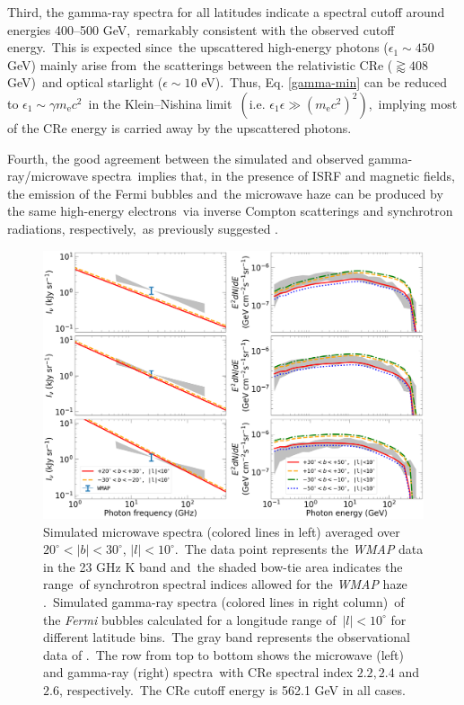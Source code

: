 \documentclass[fleqn,usenatbib,useAMS]{mnras}
\begin{document}
Third, the gamma-ray spectra for all latitudes indicate a spectral cutoff around energies 400--500 GeV,\
remarkably consistent with the observed cutoff energy.\
This is expected since\
the upscattered high-energy photons ($\epsilon_{1}\sim450$ GeV) mainly arise from\
the scatterings between the relativistic CRe ($\gtrapprox 408$ GeV)\
and optical starlight ($\epsilon \sim 10$ eV).\
Thus, Eq. \ref{gamma-min} can be reduced to $\epsilon_{1}\sim\gamma m_{\text{e}}c^2$\
in the Klein--Nishina limit\
$\left(\text{i.e. }\epsilon_{1}\epsilon \gg \left(m_{\text{e}}c^2\right)^2\right)$,\
implying most of the CRe energy is carried away by the upscattered photons.

Fourth, the good agreement between the simulated and observed gamma-ray/microwave spectra\
implies that, in the presence of ISRF and magnetic fields, the emission of the Fermi bubbles and\
the microwave haze can be produced by the same high-energy electrons\
via inverse Compton scatterings and synchrotron radiations, respectively,\
as previously suggested \citep{Su2010,Dobler2012}.

\begin{figure}
  \includegraphics[width=\linewidth]{figures/fig__spectrum.png}
  \caption{
      Simulated microwave spectra (colored lines in left) averaged over $20^{\circ}<|b|<30^{\circ}$, $|l|<10^{\circ}$.\
      The data point represents the \textit{WMAP} data in the 23 GHz K band and\
      the shaded bow-tie area indicates the range\
      of synchrotron spectral indices allowed for the \textit{WMAP} haze \citep{Dobler_2008}.\
      Simulated gamma-ray spectra (colored lines in right column)\
      of the \textit{Fermi} bubbles calculated for a longitude range of\
      $|l|<10^{\circ}$ for different latitude bins.\
      The gray band represents the observational data of \citet{Ackermann2014}.\
      The row from top to bottom shows the microwave (left) and gamma-ray (right) spectra\
      with CRe spectral index $2.2, 2.4$ and $2.6$, respectively.\
      The CRe cutoff energy is 562.1 GeV in all cases.
  }
  \label{fig__gammaRaySynchtronSpectrum}
\end{figure}
\end{document}
